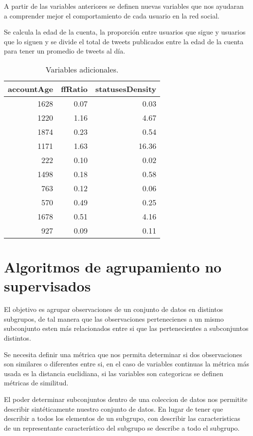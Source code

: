 \documentclass[openright, 12pt, twoside]{report}\usepackage[]{graphicx}\usepackage[]{color}
\begin{document}
A partir de las variables anteriores se definen nuevas variables que nos ayudaran a comprender mejor el comportamiento de cada usuario en la red social.

Se calcula la edad de la cuenta, la proporción entre usuarios que sigue y usuarios que lo siguen y se divide el total de tweets publicados entre la edad de la cuenta para tener un promedio de tweets al día. 

\begin{table}[ht]
\centering
\begin{tabular}{rrr}
  \hline
accountAge & ffRatio & statusesDensity \\ 
  \hline
1628 & 0.07 & 0.03 \\ 
  1220 & 1.16 & 4.67 \\ 
  1874 & 0.23 & 0.54 \\ 
  1171 & 1.63 & 16.36 \\ 
  222 & 0.10 & 0.02 \\ 
  1498 & 0.18 & 0.58 \\ 
  763 & 0.12 & 0.06 \\ 
  570 & 0.49 & 0.25 \\ 
  1678 & 0.51 & 4.16 \\ 
  927 & 0.09 & 0.11 \\ 
   \hline
\end{tabular}
\caption{Variables adicionales.} 
\end{table}


\chapter{Algoritmos de agrupamiento no supervisados}

El objetivo es agrupar observaciones de un conjunto de datos en distintos subgrupos, de tal manera que las observaciones pertenecienes a un mismo subconjunto  esten más relacionados entre si que las pertenecientes a subconjuntos distintos.

Se necesita definir una métrica que nos permita determinar si dos observaciones son similares o diferentes entre si, en el caso de variables continuas la métrica más usada es la distancia euclidiana, si las variables son categoricas se definen métricas de similitud.

El poder determinar subconjuntos dentro de una coleccion de datos nos permitite describir sintéticamente nuestro conjunto de datos. En lugar de tener que describir a todos los elementos de un subgrupo, con describir las caracteristicas de un representante característico del subgrupo se describe a todo el subgrupo.
\end{document}
